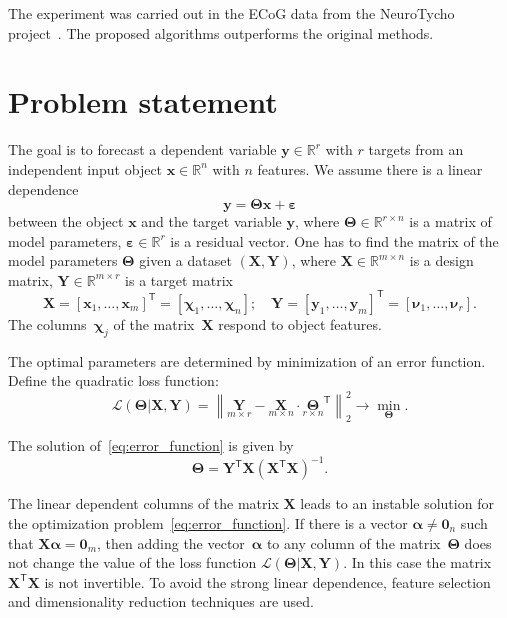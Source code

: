\documentclass[12pt,twoside]{article}
\theoremstyle{definition}
\newcommand{\bx}{\mathbf{x}}
\newcommand{\by}{\mathbf{y}}
\newcommand{\bY}{\mathbf{Y}}
\newcommand{\bX}{\mathbf{X}}
\newcommand{\bbR}{\mathbb{R}}
\newcommand{\T}{\mathsf{T}}
\newcommand{\bchi}{\boldsymbol{\chi}}
\newcommand{\bnu}{\boldsymbol{\nu}}
\newcommand{\bTheta}{\boldsymbol{\Theta}}
\newcommand{\bZero}{\boldsymbol{0}}
\begin{document}
The experiment was carried out in the ECoG data from the NeuroTycho project~\cite{neurotycho}. 
The proposed algorithms outperforms the original methods.

\section{Problem statement}
The goal is to forecast a dependent variable $\by \in \bbR^r$ with $r$ targets from an independent input object $\bx \in \bbR^n$ with $n$ features.
We assume there is a linear dependence
\begin{equation}
	\by = \bTheta \bx+ \boldsymbol{\varepsilon}
	\label{eq:model}
\end{equation}
between the object $\bx$ and the target variable $\by$,
where $\bTheta \in \bbR^{r \times n}$ is a matrix of model parameters, $\boldsymbol{\varepsilon} \in \bbR^{r}$ is a residual vector.
One has to find the matrix of the model parameters $\bTheta$ given a dataset $\left( \bX, \bY \right)$, where $\bX \in \bbR^{m \times n}$ is a design matrix, $\bY \in \bbR^{m \times r}$ is a target matrix
\[
	\bX = [\bx_1, \dots, \bx_m]^{\T} =  [\bchi_1, \dots, \bchi_n]; \quad \bY = [\by_1, \dots, \by_m]^{\T} =  [\bnu_1, \dots, \bnu_r].
\]
The columns~$\bchi_j$ of the matrix~$\bX$ respond to object features.

The optimal parameters are determined by minimization of an error function.
Define the quadratic loss function:
\begin{equation}
	\mathcal{L}(\bTheta | \bX, \bY) = {\left\| \underset{m \times r}{\mathbf{Y}}  - \underset{m \times n}{\bX} \cdot \underset{r \times n}{\bTheta}^{\T} \right\| }_2^2 \rightarrow\min_{\bTheta}.
\label{eq:error_function}
\end{equation}

 The solution of~\eqref{eq:error_function} is given by
 \[
 	\bTheta = \bY^{\T} \bX (\bX^{\T} \bX)^{-1}.
 \]

 The linear dependent columns of the matrix $\bX$ leads to an instable solution for the optimization problem~\eqref{eq:error_function}.
 If there is a vector $\boldsymbol{\alpha} \neq \bZero_n$ such that $\bX \boldsymbol{\alpha}= \bZero_m$, then adding the vector~$\boldsymbol{\alpha}$ to any column of the matrix~$\bTheta$ does not change the value of the loss function $\mathcal{L}(\bTheta | \bX, \bY)$.
 In this case the matrix $\bX^{\T} \bX$ is not invertible.
 To avoid the strong linear dependence, feature selection and dimensionality reduction techniques are used.
\end{document}
